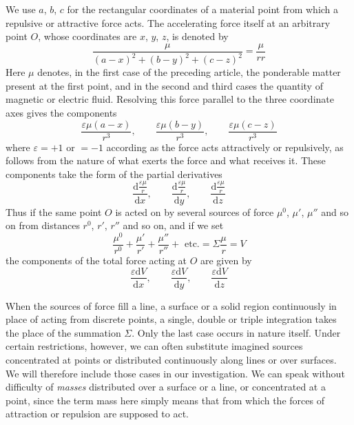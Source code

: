 We use $a$, $b$, $c$ for the rectangular coordinates of a material point from which a repulsive or attractive force acts. The accelerating force itself at an arbitrary point $O$, whose coordinates are $x$, $y$, $z$, is denoted by
\[
\frac{\mu}{(a-x)^2+(b-y)^2+(c-z)^2}=\frac{\mu}{rr}
\]
Here $\mu$ denotes, in the first case of the preceding article, the ponderable matter
present at the first point, and in the second and third cases the quantity of magnetic or electric fluid. Resolving this force parallel to the three coordinate axes gives the components
\[
\frac{\varepsilon\mu(a-x)}{r^3},\qquad \frac{\varepsilon\mu(b-y)}{r^3},\qquad \frac{\varepsilon\mu(c-z)}{r^3}
\]
where $\varepsilon=+1$ or $=-1$ according as the force acts attractively or repulsively, as follows from the nature of what exerts the force and what receives it. These components take the form of the partial derivatives
\[
\frac{\mathrm{d}\frac{\varepsilon\mu}{r}}{\mathrm{d}x},\qquad \frac{\mathrm{d}\frac{\varepsilon\mu}{r}}{\mathrm{d}y},\qquad \frac{\mathrm{d}\frac{\varepsilon\mu}{r}}{\mathrm{d}z}
\]
Thus if the same point $O$ is acted on by several sources of force $\mu^0$, $\mu'$, $\mu''$ and so on from distances $r^0$, $r'$, $r''$ and so on, and if we set
\[
\frac{\mu^0}{r^0}+\frac{\mu'}{r'}+\frac{\mu''}{r''}+\text{ etc.}=\Sigma\frac{\mu}{r}=V
\]
the components of the total force acting at $O$ are given by
\[
\frac{\varepsilon\mathrm{d}V}{\mathrm{d}x},\qquad \frac{\varepsilon\mathrm{d}V}{\mathrm{d}y},\qquad \frac{\varepsilon\mathrm{d}V}{\mathrm{d}z}
\]

When the sources of force fill a line, a surface or a solid region continuously in place of acting from discrete points, a single, double or triple integration takes the place of the summation $\Sigma$. Only the last case occurs in nature itself. Under certain restrictions, however, we can often substitute imagined sources concentrated at points or distributed continuously along lines or over surfaces. We will therefore include those cases in our investigation. We can speak without difficulty of \textit{masses} distributed over a surface or a line, or concentrated at a point, since the term mass here simply means that from which the forces of attraction or repulsion are supposed to act.

